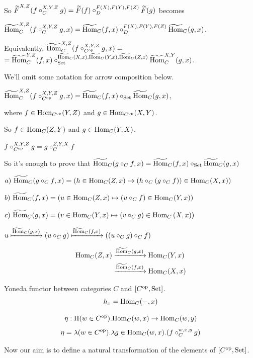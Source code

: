 \documentclass[10pt,a4paper]{article}
\begin{document}
\begin{enumerate}
So $\FMor^{X,Z}(f\circ_C^{X,Y,Z} g)=\FMor(f)\circ_D^{F(X),F(Y),F(Z)} \FMor(g)$ becomes

$\HomMor_C^{X,Z}(f\circ_C^{X,Y,Z} g, x)=\HomMor_C(f,x)\circ_D^{F(X),F(Y),F(Z)} \HomMor_C(g,x)$.

Equivalently, $\HomMor_C^{X,Z}(f\circ_{C^\op}^{X,Y,Z} g, x)=$
 $=\HomMor_C^{Y,Z}(f,x)\circ_\Set^{\HomMor_C(X,x),\HomMor_C(Y,x),\HomMor_C(Z,x)} \HomMor_C^{X,Y}(g,x)$.

We'll omit some notation for arrow composition below.

$\HomMor_C^{X,Z}(f\circ_{C^\op}^{X,Y,Z} g, x)=\HomMor_C(f,x)\circ_\Set \HomMor_C(g,x)$,

where $f\in\Hom_{C^\op}(Y,Z)$ and $g\in\Hom_{C^\op}(X,Y)$.

So $f\in\Hom_{C}(Z,Y)$ and $g\in\Hom_{C}(Y,X)$.

$f\circ_{C^\op}^{X,Y,Z} g = g\circ_{C}^{Z,Y,X} f$

So it's enough to prove that $\HomMor_C(g\circ_C f, x) = \HomMor_C(f, x) \circ_\Set \HomMor_C(g, x)$

$a)\ \HomMor_C(g\circ_C f, x) = (h \in\Hom_C(Z,x) \mapsto (h \circ_C (g\circ_C f))\in\Hom_C(X,x))$

$b)\ \HomMor_C(f, x) = \left(u \in\Hom_C(Z,x) \mapsto (u \circ_C f)\in\Hom_C(Y,x)\right)$

$c)\ \HomMor_C(g, x) = \left(v \in\Hom_C(Y,x) \mapsto (v \circ_C g)\in\Hom_C\left(X,x\right)\right)$



$u \xmapsto{\HomMor_C(g, x)} (u \circ_C g) \xmapsto{\HomMor_C(f, x)} ((u \circ_C g) \circ_C f)$


\begin{align*}
\Hom_C(Z,x) &\xrightarrow{\HomMor_C(g, x)} \Hom_C(Y,x) \\ &
\xrightarrow{\HomMor_C(f, x)} \Hom_C(X,x)
\end{align*}


\end{enumerate}
\myqed
\begin{definition}
Yoneda functor between categories $C$ and $[C^\op,\Set]$.
$$h_x = \Hom_C(-, x)$$
\end{definition}


\begin{definition}
$$\eta : \Pi(w\in C^\op).\Hom_C(w,x)\to \Hom_C(w,y)$$
$$\eta = \lambda (w\in C^\op). \lambda g\in\Hom_C(w,x).(f\circ_C^{w,x,y} g)$$
\end{definition}
Now our aim is to define a natural transformation of the elements of $[C^\op,\Set]$.
\end{document}
